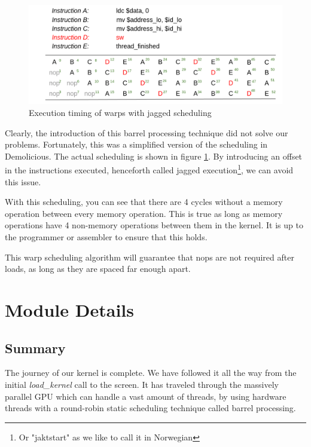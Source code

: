 \documentclass[../main/report.tex]{subfiles}
\begin{document}
\begin{figure}[htp]
\centering
\includegraphics[scale=0.25]{../gpu/diagrams/jaktstart_num.png}
\caption{Execution timing of warps with jagged scheduling}
\label{fig:jagged}
\end{figure}

Clearly, the introduction of this barrel processing technique did not solve our problems.
Fortunately, this was a simplified version of the scheduling in Demolicious.
The actual scheduling is shown in figure \ref{fig:jagged}.
By introducing an offset in the instructions executed, henceforth called jagged execution\footnote{Or "jaktstart" as we like to call it in Norwegian}, we can avoid this issue.

With this scheduling, you can see that there are 4 cycles without a memory operation between every memory operation.
This is true as long as memory operations have 4 non-memory operations between them in the kernel.
It is up to the programmer or assembler to ensure that this holds.

This warp scheduling algorithm will guarantee that nops are not required after loads,
as long as they are spaced far enough apart.

\section{Module Details}













\subsection{Summary}
The journey of our kernel is complete.
We have followed it all the way from the initial \emph{load\_kernel} call to the screen.
It has traveled through the massively parallel GPU which can handle a vast amount of threads,
by using hardware threads with a round-robin static scheduling technique called barrel processing.
\end{document}

